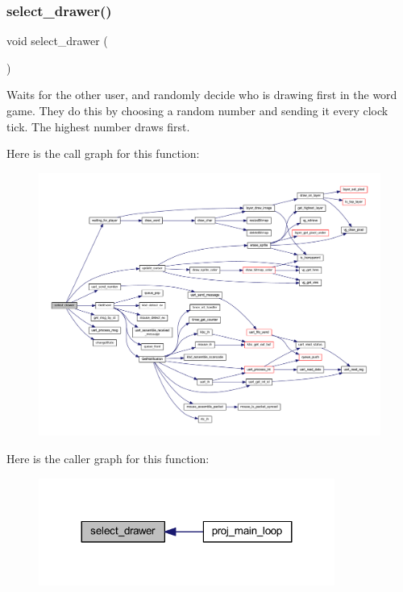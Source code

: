 \subsubsection{\texorpdfstring{select\+\_\+drawer()}{select\_drawer()}}
{\footnotesize\ttfamily void select\+\_\+drawer (\begin{DoxyParamCaption}{ }\end{DoxyParamCaption})}



Waits for the other user, and randomly decide who is drawing first in the word game. They do this by choosing a random number and sending it every clock tick. The highest number draws first. 

Here is the call graph for this function\+:
\nopagebreak
\begin{figure}[H]
\begin{center}
\leavevmode
\includegraphics[width=350pt]{group__pengoo_gab4e279f31fb3e6e034e2b173aaa1a2fb_cgraph}
\end{center}
\end{figure}
Here is the caller graph for this function\+:\nopagebreak
\begin{figure}[H]
\begin{center}
\leavevmode
\includegraphics[width=275pt]{group__pengoo_gab4e279f31fb3e6e034e2b173aaa1a2fb_icgraph}
\end{center}
\end{figure}
\mbox{\label{group__pengoo_ga4de72e6fe25e96efa9d419d420f34fcb}} 
